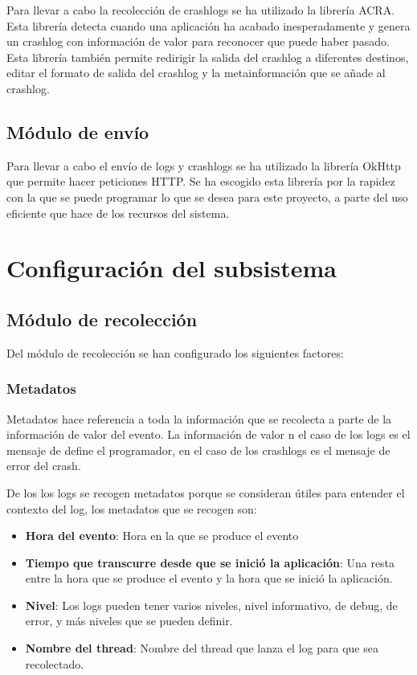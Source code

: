 Para llevar a cabo la recolección de crashlogs se ha utilizado la librería ACRA\cite{Tfg:acra}. Esta librería detecta cuando una aplicación ha acabado inesperadamente y genera un crashlog con información de valor para reconocer que puede haber pasado. Esta librería también permite redirigir la salida del crashlog a diferentes destinos, editar el formato de salida del crashlog y la metainformación que se añade al crashlog.

\subsection{Módulo de envío}
Para llevar a cabo el envío de logs y crashlogs se ha utilizado la librería OkHttp\cite{Tfg:okhttp} que permite hacer peticiones HTTP\cite{Tfg:HTTPv1-1}. Se ha escogido esta librería por la rapidez con la que se puede programar lo que se desea para este proyecto, a parte del uso eficiente que hace de los recursos del sistema.

\section{Configuración del subsistema}

\subsection{Módulo de recolección}


Del módulo de recolección se han configurado los siguientes factores:

\subsubsection{Metadatos}
Metadatos hace referencia a toda la información que se recolecta a parte de la información de valor del evento. La información de valor n el caso de los logs es el mensaje de define el programador, en el caso de los crashlogs es el mensaje de error del crash.

De los los logs se recogen metadatos porque se consideran útiles para entender el contexto del log, los metadatos que se recogen son:

\begin{itemize}	
	\item \textbf{Hora del evento}: Hora en la que se produce el evento
	\item \textbf{Tiempo que transcurre desde que se inició la aplicación}: Una resta entre la hora que se produce el evento y la hora que se inició la aplicación.
	\item \textbf{Nivel}: Los logs pueden tener varios niveles, nivel informativo, de debug, de error, y más niveles que se pueden definir.
	\item \textbf{Nombre del thread}: Nombre del thread que lanza el log para que sea recolectado.
\end{itemize}

